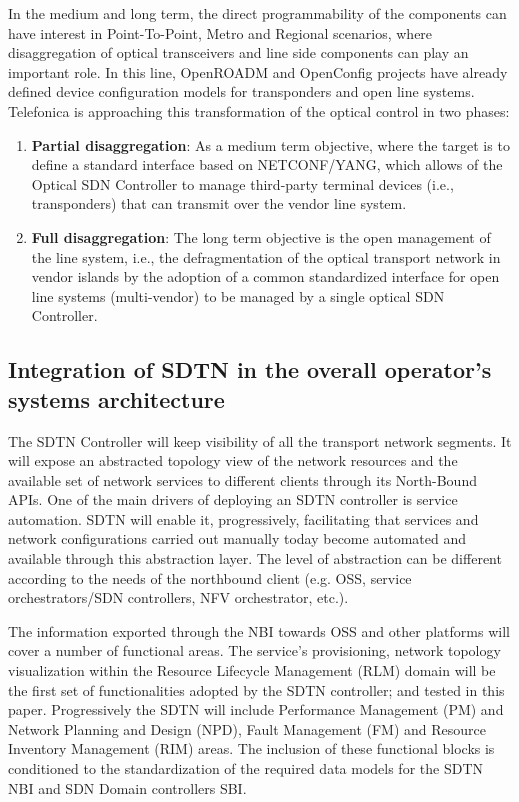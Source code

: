 \documentclass[a4paper,fleqn]{cas-dc}
\begin{document}
In the medium and long term, the direct programmability of the components can have interest in Point-To-Point, Metro and Regional scenarios, where disaggregation of optical transceivers and line side components can play an important role. In this line, OpenROADM \cite{oda2016learning,kundrat2019opening} and OpenConfig \cite{shaikhopenconfig} projects have already defined device configuration models for transponders and open line systems. Telefonica is approaching this transformation of the optical control in two phases:

\begin{enumerate}
    \item \textbf{Partial disaggregation}: As a medium term objective, where the target is to define a standard interface based on NETCONF/YANG, which allows of the Optical SDN Controller to manage third-party terminal devices (i.e., transponders) that can transmit over the vendor line system.
    
    \item \textbf{Full disaggregation}: The long term objective is the open management of the line system, i.e., the defragmentation of the optical transport network in vendor islands by the adoption of a common standardized interface for open line systems (multi-vendor) to be managed by a single optical SDN Controller.
\end{enumerate}

\subsection{Integration of SDTN in the overall operator’s systems architecture}
\label{section:sdtn}
The SDTN Controller will keep visibility of all the transport network segments. It will expose an abstracted topology view of the network resources and the available set of network services to different clients through its North-Bound APIs.  
One of the main drivers of deploying an SDTN controller is service automation. SDTN will enable it, progressively, facilitating that services and network configurations carried out manually today become automated and available through this abstraction layer.  The level of abstraction can be different according to the needs of the northbound client (e.g. OSS, service orchestrators/SDN controllers, NFV orchestrator, etc.). 

The information exported through the NBI towards OSS and other platforms will cover a number of functional areas. The service’s provisioning, network topology visualization within the Resource Lifecycle Management (RLM) domain will be the first set of functionalities adopted by the SDTN controller; and tested in this paper. Progressively the SDTN will include Performance Management (PM) and Network Planning and Design (NPD), Fault Management (FM) and Resource Inventory Management (RIM) areas. The inclusion of these functional blocks is conditioned to the standardization of the required data models for the SDTN NBI and SDN Domain controllers SBI.
\end{document}
